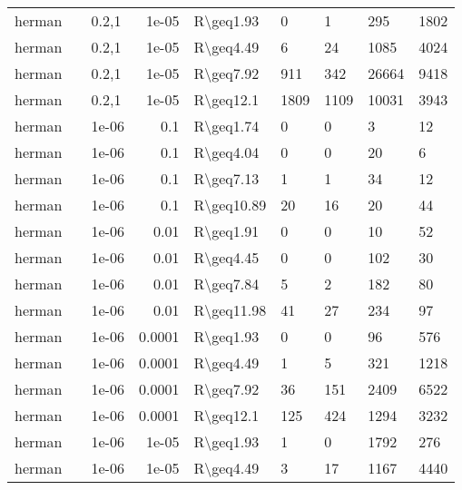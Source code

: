 \begin{longtable}{lllrlllll}
 herman        &           & 0.2,1 & 1e-05  & R\textbackslash{}geq1.93  & 0    & 1    & 295      & 1802    \\
 herman        &           & 0.2,1 & 1e-05  & R\textbackslash{}geq4.49  & 6    & 24   & 1085     & 4024    \\
 herman        &           & 0.2,1 & 1e-05  & R\textbackslash{}geq7.92  & 911  & 342  & 26664    & 9418    \\
 herman        &           & 0.2,1 & 1e-05  & R\textbackslash{}geq12.1  & 1809 & 1109 & 10031    & 3943    \\
 herman        &           & 1e-06 & 0.1    & R\textbackslash{}geq1.74  & 0    & 0    & 3        & 12      \\
 herman        &           & 1e-06 & 0.1    & R\textbackslash{}geq4.04  & 0    & 0    & 20       & 6       \\
 herman        &           & 1e-06 & 0.1    & R\textbackslash{}geq7.13  & 1    & 1    & 34       & 12      \\
 herman        &           & 1e-06 & 0.1    & R\textbackslash{}geq10.89 & 20   & 16   & 20       & 44      \\
 herman        &           & 1e-06 & 0.01   & R\textbackslash{}geq1.91  & 0    & 0    & 10       & 52      \\
 herman        &           & 1e-06 & 0.01   & R\textbackslash{}geq4.45  & 0    & 0    & 102      & 30      \\
 herman        &           & 1e-06 & 0.01   & R\textbackslash{}geq7.84  & 5    & 2    & 182      & 80      \\
 herman        &           & 1e-06 & 0.01   & R\textbackslash{}geq11.98 & 41   & 27   & 234      & 97      \\
 herman        &           & 1e-06 & 0.0001 & R\textbackslash{}geq1.93  & 0    & 0    & 96       & 576     \\
 herman        &           & 1e-06 & 0.0001 & R\textbackslash{}geq4.49  & 1    & 5    & 321      & 1218    \\
 herman        &           & 1e-06 & 0.0001 & R\textbackslash{}geq7.92  & 36   & 151  & 2409     & 6522    \\
 herman        &           & 1e-06 & 0.0001 & R\textbackslash{}geq12.1  & 125  & 424  & 1294     & 3232    \\
 herman        &           & 1e-06 & 1e-05  & R\textbackslash{}geq1.93  & 1    & 0    & 1792     & 276     \\
 herman        &           & 1e-06 & 1e-05  & R\textbackslash{}geq4.49  & 3    & 17   & 1167     & 4440    \\

\end{longtable}
